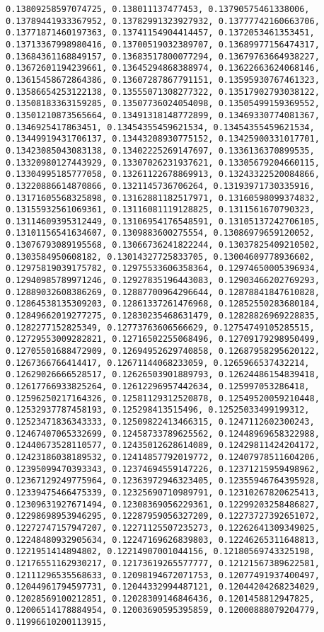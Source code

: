 \documentclass[11pt]{article}
\begin{document}
\begin{Verbatim}[commandchars=\\\{\}]
0.13809258597074725, 0.138011137477453, 0.13790575461338006, 0.13789441933367952, 0.13782991323927932, 0.13777742160663706, 0.13771871460197363, 0.13741154904414457, 0.1372053461353451, 0.13713367998980416, 0.13700519032389707, 0.13689977156474317, 0.13684361168849157, 0.13683517800077294, 0.13679763664938227, 0.13672601194239661, 0.13645294868388974, 0.13622663624068146, 0.13615458672864386, 0.13607287867791151, 0.13595930767461323, 0.13586654253122138, 0.13555071308277322, 0.13517902793038122, 0.13508183363159285, 0.13507736024054098, 0.13505499159369552, 0.13501210873565664, 0.13491318148772899, 0.13469330774081367, 0.1346925417863451, 0.13454355459621534, 0.13454355459621534, 0.13449919431706137, 0.13443208930775152, 0.13425900331017701, 0.13423085043083138, 0.13402225269147697, 0.1336136370899535, 0.13320980127443929, 0.13307026231937621, 0.13305679204660115, 0.13304995185777058, 0.13261122678869913, 0.13243322520084866, 0.13220886614870866, 0.1321145736706264, 0.13193971730335916, 0.13171605568325898, 0.13162881182517971, 0.13160598099374832, 0.13155932561069361, 0.13116081119128825, 0.1311561670790323, 0.13114609395312449, 0.13106954176548591, 0.13105137242706105, 0.13101156541634607, 0.1309883600275554, 0.13086979659120052, 0.13076793089195568, 0.13066736241822244, 0.13037825409210502, 0.1303584950608182, 0.13014327725833705, 0.13004609778936602, 0.12975819039175782, 0.12975533606358364, 0.12974650005396934, 0.12940985789971246, 0.12927835196443083, 0.12903466202769293, 0.12889032608386269, 0.12887700964296644, 0.12878841847610828, 0.12864538135309203, 0.12861337261476968, 0.12852550283680184, 0.12849662019277275, 0.12830235468631479, 0.12828826969228835, 0.1282277152825349, 0.12773763606566629, 0.12754749105285515, 0.12729553009282821, 0.12716502255068496, 0.12709179298950499, 0.12705501688472909, 0.12694952629740858, 0.12687958295620122, 0.1267366766414417, 0.12671144068233059, 0.1265966537432214, 0.12629026666528517, 0.12626503901889793, 0.12624486154839418, 0.12617766933825264, 0.12612296957442634, 0.125997053286418, 0.12596250217164326, 0.12581129312520878, 0.12549520059210448, 0.12532937787458193, 0.125298413515496, 0.12525033499199312, 0.12523471836343333, 0.12509822413466315, 0.1247112602300243, 0.12467407065332699, 0.12458733789625562, 0.12448969658322988, 0.12440673528110577, 0.12435012628614089, 0.12429811424204172, 0.12423186038189532, 0.12414857792019772, 0.12407978511604206, 0.12395099470393343, 0.12374694559147226, 0.12371215959498962, 0.12367129249775964, 0.12363972946323405, 0.12355946764395928, 0.12339475466475339, 0.12325690710989791, 0.12310267820625413, 0.12309631927671494, 0.12308369056229361, 0.12299203258486827, 0.12298698953946295, 0.12287959056327209, 0.12273727392651072, 0.12272747157947207, 0.12271125507235273, 0.12262641309349025, 0.12248480932905634, 0.12247169626839803, 0.12246265311648813, 0.1221951414894802, 0.12214907001044156, 0.12180569743325198, 0.12176551162930217, 0.12173619265577777, 0.12121567389622581, 0.12111296535568633, 0.12098194672071753, 0.12077491937400497, 0.12044961794597731, 0.12044332994487121, 0.12044204268234029, 0.12028569100212851, 0.12028309146846436, 0.1201458812947825, 0.12006514178884954, 0.12003690595395859, 0.12000888079204779, 0.11996610200113915, 
\end{Verbatim}
\end{document}
